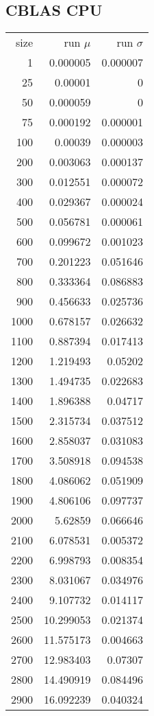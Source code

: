 \subsection*{CBLAS CPU}

\begin{longtable}{r r r}
size & run $\mu$ & run $\sigma$ \\
1 & 0.000005 & 0.000007 \\
25 & 0.00001 & 0 \\
50 & 0.000059 & 0 \\
75 & 0.000192 & 0.000001 \\
100 & 0.00039 & 0.000003 \\
200 & 0.003063 & 0.000137 \\
300 & 0.012551 & 0.000072 \\
400 & 0.029367 & 0.000024 \\
500 & 0.056781 & 0.000061 \\
600 & 0.099672 & 0.001023 \\
700 & 0.201223 & 0.051646 \\
800 & 0.333364 & 0.086883 \\
900 & 0.456633 & 0.025736 \\
1000 & 0.678157 & 0.026632 \\
1100 & 0.887394 & 0.017413 \\
1200 & 1.219493 & 0.05202 \\
1300 & 1.494735 & 0.022683 \\
1400 & 1.896388 & 0.04717 \\
1500 & 2.315734 & 0.037512 \\
1600 & 2.858037 & 0.031083 \\
1700 & 3.508918 & 0.094538 \\
1800 & 4.086062 & 0.051909 \\
1900 & 4.806106 & 0.097737 \\
2000 & 5.62859 & 0.066646 \\
2100 & 6.078531 & 0.005372 \\
2200 & 6.998793 & 0.008354 \\
2300 & 8.031067 & 0.034976 \\
2400 & 9.107732 & 0.014117 \\
2500 & 10.299053 & 0.021374 \\
2600 & 11.575173 & 0.004663 \\
2700 & 12.983403 & 0.07307 \\
2800 & 14.490919 & 0.084496 \\
2900 & 16.092239 & 0.040324 \\

\end{longtable}

